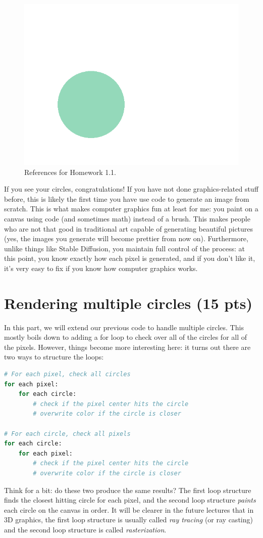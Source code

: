 \begin{figure}[ht]
    \centering
    \includegraphics[width=0.5\linewidth]{imgs/hw_1_1.png}
    \caption{References for Homework 1.1.}
    \label{fig:hw1_1}
\end{figure}

If you see your circles, congratulations! If you have not done graphics-related stuff before, this is likely the first time you have use code to generate an image from scratch. This is what makes computer graphics fun at least for me: you paint on a canvas using code (and sometimes math) instead of a brush. This makes people who are not that good in traditional art capable of generating beautiful pictures (yes, the images you generate will become prettier from now on). Furthermore, unlike things like Stable Diffusion, you maintain full control of the process: at this point, you know exactly how each pixel is generated, and if you don't like it, it's very easy to fix if you know how computer graphics works.

\section{Rendering multiple circles (15 pts)}

In this part, we will extend our previous code to handle multiple circles. This mostly boils down to adding a for loop to check over all of the circles for all of the pixels. However, things become more interesting here: it turns out there are two ways to structure the loops:
\begin{lstlisting}[language=Python]
# For each pixel, check all circles
for each pixel:
    for each circle:
        # check if the pixel center hits the circle
        # overwrite color if the circle is closer

# For each circle, check all pixels
for each circle:
    for each pixel:
        # check if the pixel center hits the circle
        # overwrite color if the circle is closer
\end{lstlisting}
Think for a bit: do these two produce the same results? The first loop structure finds the closest hitting circle for each pixel, and the second loop structure \emph{paints} each circle on the canvas in order. It will be clearer in the future lectures that in 3D graphics, the first loop structure is usually called \emph{ray tracing} (or ray casting) and the second loop structure is called \emph{rasterization}.

